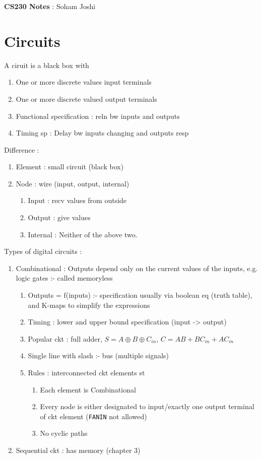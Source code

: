 \documentclass{article}[12pt]
\begin{document}
\textbf{CS230 Notes} : Soham Joshi
\section{Circuits}

A ciruit is a black box with 
\begin{enumerate}
  \item One or more discrete values input terminals
  \item One or more discrete valued output terminals
  \item Functional specification : reln bw inputs and outputs
  \item Timing sp : Delay bw inputs changing and outputs resp
\end{enumerate}

Difference : 
\begin{enumerate}
  \item Element : small circuit (black box)
  \item Node : wire (input, output, internal)
  \begin{enumerate}
    \item Input : recv values from outside
    \item Output : give values
    \item Internal : Neither of the above two.
  \end{enumerate}
\end{enumerate}

Types of digital circuits :
\begin{enumerate}
  \item Combinational : Outputs depend only on the current values of the inputs, e.g. logic gates :- called memoryless
  \begin{enumerate}
    \item Outputs = f(inputs) :- specification usually via boolean eq (truth table), and K-maps to simplify the expressions 
    \item Timing : lower and upper bound specification (input -> output)
    \item Popular ckt : full adder, $S = A \oplus B \oplus C_{in}$, $C = AB + BC_{in} + AC_{in}$
    \item Single line with slash :- bus (multiple signals)
    \item Rules : interconnected ckt elements st\begin{enumerate}
      \item Each element is Combinational
      \item Every node is either designated to input/exactly one output terminal of ckt element (\verb|FANIN| not allowed)
      \item No cyclic paths
    \end{enumerate}
  \end{enumerate}
  
  \item Sequential ckt : has memory (chapter 3)
  
\end{enumerate} 
\end{document}
